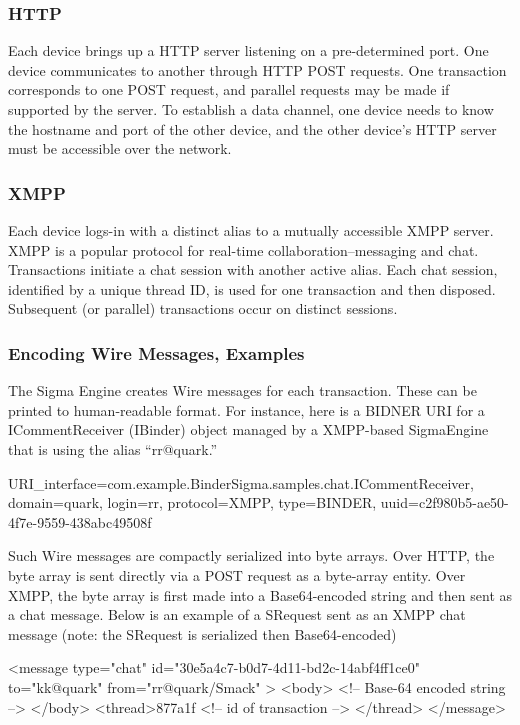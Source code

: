\documentclass[prodmode]{acmlarge}
\begin{document}
\subsubsection{HTTP}
Each device brings up a HTTP server listening on a pre-determined port. One device communicates to another through HTTP POST requests. One transaction corresponds to one POST request, and parallel requests may be made if supported by the server. To establish a data channel, one device needs to know the hostname and port of the other device, and the other device's HTTP server must be accessible over the network.

\subsubsection{XMPP}
Each device logs-in with a distinct alias to a mutually accessible XMPP server. XMPP is a popular protocol for real-time collaboration--messaging and chat. Transactions initiate a chat session with another active alias. Each chat session, identified by a unique thread ID, is used for one transaction and then disposed. Subsequent (or parallel) transactions occur on distinct sessions.

\subsubsection{Encoding Wire Messages, Examples}
The Sigma Engine creates Wire messages for each transaction. These can be printed to human-readable format. For instance, here is a BIDNER URI for a ICommentReceiver (IBinder) object managed by a XMPP-based SigmaEngine that is using the alias ``rr@quark.''

\begin{snippet}
URI{_interface=com.example.BinderSigma.samples.chat.ICommentReceiver,
domain=quark, login=rr, protocol=XMPP, type=BINDER,
uuid=c2f980b5-ae50-4f7e-9559-438abc49508f}
\end{snippet}

Such Wire messages are compactly serialized into byte arrays. Over HTTP, the byte array is sent directly via a POST request as a byte-array entity. Over XMPP, the byte array is first made into a Base64-encoded string and then sent as a chat message. Below is an example of a SRequest sent as an XMPP chat message (note: the SRequest is serialized then Base64-encoded)

\begin{snippet}
<message type="chat" id="30e5a4c7-b0d7-4d11-bd2c-14abf4ff1ce0"
        to="kk@quark" from="rr@quark/Smack" >
        <body> <!-- Base-64 encoded string --> </body>
        <thread>877a1f <!-- id of transaction --> </thread>
        </message>
\end{snippet}
\end{document}
